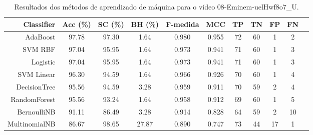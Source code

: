 \begin{table}[!htb]
\centering
\caption{Resultados dos métodos de aprendizado de máquina para o vídeo 08-Eminem-uelHwf8o7_U.}
\label{tab:08-Eminem-uelHwf8o7_U}
\begin{tabular}{r|c|c|c|c|c|c|c|c|c|c}
\hline\hline
Classifier & Acc (\%) & SC (\%) & BH (\%) & F-medida & MCC & TP & TN & FP & FN \\ \hline
AdaBoost & 97.78 & 97.30 & 1.64 & 0.980 & 0.955 & 72 & 60 & 1 & 2 \\ 
SVM RBF & 97.04 & 95.95 & 1.64 & 0.973 & 0.941 & 71 & 60 & 1 & 3 \\ 
Logistic & 97.04 & 95.95 & 1.64 & 0.973 & 0.941 & 71 & 60 & 1 & 3 \\ 
SVM Linear & 96.30 & 94.59 & 1.64 & 0.966 & 0.926 & 70 & 60 & 1 & 4 \\ 
DecisionTree & 95.56 & 94.59 & 3.28 & 0.959 & 0.911 & 70 & 59 & 2 & 4 \\ 
RandomForest & 95.56 & 93.24 & 1.64 & 0.958 & 0.912 & 69 & 60 & 1 & 5 \\ 
BernoulliNB & 91.11 & 86.49 & 3.28 & 0.914 & 0.828 & 64 & 59 & 2 & 10 \\ 
MultinomialNB & 86.67 & 98.65 & 27.87 & 0.890 & 0.747 & 73 & 44 & 17 & 1 \\ 
\hline\hline
\end{tabular}
\end{table}
